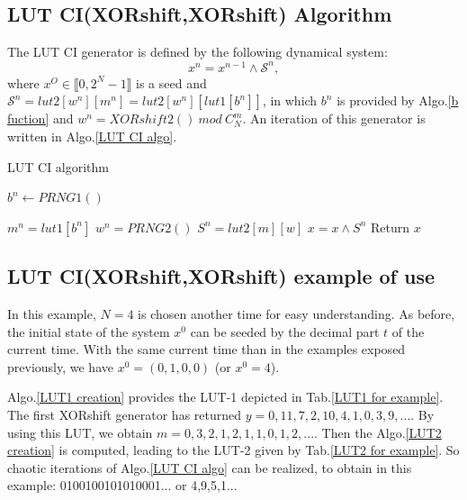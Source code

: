 \subsection{LUT CI(XORshift,XORshift) Algorithm}

The LUT CI generator is defined by the following dynamical system:
\begin{equation}
x^n = x^{n-1} \wedge \mathcal{S}^n,
\end{equation}
where $x^O\in \llbracket 0,2^N-1\rrbracket$ is a seed and $\mathcal{S}^n = lut2[w^n][m^n] = lut2[w^n][lut1[b^n]]$, 
in which $b^n$ is provided by Algo.\ref{b fuction} and $w^n=XORshift2()~mod~C^m_N$.
An iteration of this generator is written in Algo.\ref{LUT CI algo}.
 \begin{algorithm}
 \caption{LUT CI algorithm}\label{LUT CI algo}
 \begin{algorithmic}[1]


  \STATE $b^n\leftarrow PRNG1()$

    \STATE $m^n = lut1[b^n]$
    \STATE $w^n = PRNG2()$
    \STATE $S^n = lut2[m][w]$
    \STATE $x = x \wedge S^n$
    \STATE Return $x$

 \end{algorithmic}
 \end{algorithm}

\subsection{LUT CI(XORshift,XORshift) example of use}
In this example, $N = 4$ is chosen another time for easy understanding.
As before, the initial state of the system $x^0$ can be seeded by the decimal part $t$ of the current time.
With the same current time than in the examples exposed previously, we have $x^0 = ( 0, 1, 0, 0)$ (or $x^0=4$).

Algo.\ref{LUT1 creation} provides the LUT-1 depicted in Tab.\ref{LUT1 for example}.
The first XORshift generator has returned $y = 0, 11, 7, 2, 10, 4, 1, 0, 3, 9,...$.
By using this LUT, we obtain $m = 0, 3, 2, 1, 2, 1, 1, 0, 1, 2,...$.
Then the Algo.\ref{LUT2 creation} is computed, leading to the LUT-2 given by Tab.\ref{LUT2 for example}.
So chaotic iterations of Algo.\ref{LUT CI algo} can be realized, 
to obtain in this example: 0100100101010001... or 4,9,5,1...

